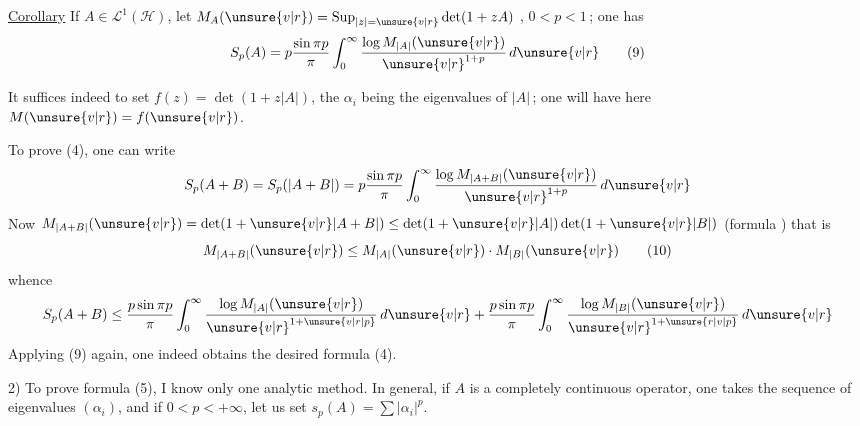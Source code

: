 \uline{Corollary}\quad\margin{\rule[-3.8cm]{0.4pt}{3.8cm}} If $A\in\mathcal L^1(\mathcal H)$, let
$M_A(\unsure{v|r})=\operatorname*{Sup}_{|z|=\unsure{v|r}}\det(1+zA)$
, 
  $0<p<1$\,; one has
\[
S_p(A)=p\frac{\sin\pi p}{\pi}\int_0^\infty\frac{\log M_{|A|}(\unsure{v|r})}{{\unsure{v|r}}^{1+p}}\,d\unsure{v|r}\tag*{(9)}
\]

It suffices indeed to set $f(z)=\det(1+z|A|)$,
the $\alpha_i$ being the eigenvalues of $|A|$\,; one will have
here $M(\unsure{v|r})=f(\unsure{v|r})$.

To prove (4), one  can write
\[
S_p(A+B)=S_p(|A+B|)=p\frac{\sin\pi p}{\pi}\int_0^\infty
\frac{\log M_{|A+B|}(\unsure{v|r})}{{\unsure{v|r}}^{1+p}}\,d\unsure{v|r}
\]
Now $M_{|A+B|}(\unsure{v|r})=\det(1+\unsure{v|r}|A+B|)\leq\det(1+\unsure{v|r}|A|)\det(1+\unsure{v|r}|B|)$
(formula \unsure{\ldots})  that is
\[
M_{|A+B|}(\unsure{v|r})\leq M_{|A|}(\unsure{v|r})\cdot M_{|B|}(\unsure{v|r})\tag*{(10)}
\]
whence
\[
S_p(A+B)\leq\frac{p\sin\pi p}{\pi}\int_0^\infty\frac{\log M_{|A|}(\unsure{v|r})}{{\unsure{v|r}}^{1+\unsure{v|r|p}}}\,d\unsure{v|r}
+\frac{p\sin\pi p}{\pi}\int_0^\infty\frac{\log M_{|B|}(\unsure{v|r})}{{\unsure{v|r}}^{1+\unsure{r|v|p}}}\,d\unsure{v|r}
\]
Applying (9) again, one indeed obtains the
desired formula (4).


2) To prove formula (5), I know
only one analytic method. In general,
 if $A$ is a completely continuous operator, one takes the
sequence of eigenvalues $(\alpha_i)$,  and if
$0<p<+\infty$, let us set $s_p(A)=\sum|\alpha_i|^p$.
